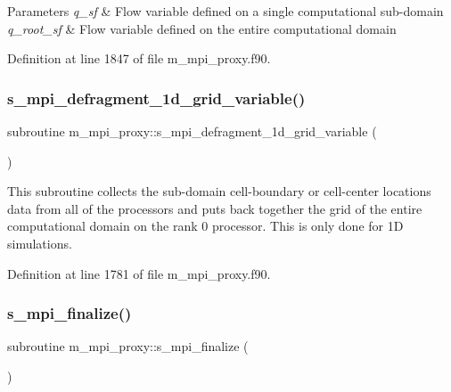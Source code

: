 \begin{DoxyParams}{Parameters}
{\em q\+\_\+sf} & Flow variable defined on a single computational sub-\/domain \\
\hline
{\em q\+\_\+root\+\_\+sf} & Flow variable defined on the entire computational domain \\
\hline
\end{DoxyParams}


Definition at line 1847 of file m\+\_\+mpi\+\_\+proxy.\+f90.

\mbox{\label{namespacem__mpi__proxy_ac15a15ba12e6110bb015af0ece5bba47}} 
\subsubsection{\texorpdfstring{s\+\_\+mpi\+\_\+defragment\+\_\+1d\+\_\+grid\+\_\+variable()}{s\_mpi\_defragment\_1d\_grid\_variable()}}
{\footnotesize\ttfamily subroutine m\+\_\+mpi\+\_\+proxy\+::s\+\_\+mpi\+\_\+defragment\+\_\+1d\+\_\+grid\+\_\+variable (\begin{DoxyParamCaption}{ }\end{DoxyParamCaption})}



This subroutine collects the sub-\/domain cell-\/boundary or cell-\/center locations data from all of the processors and puts back together the grid of the entire computational domain on the rank 0 processor. This is only done for 1D simulations. 



Definition at line 1781 of file m\+\_\+mpi\+\_\+proxy.\+f90.

\mbox{\label{namespacem__mpi__proxy_a43fbda10c02ec8bc1fc572c83090f2e5}} 
\subsubsection{\texorpdfstring{s\+\_\+mpi\+\_\+finalize()}{s\_mpi\_finalize()}}
{\footnotesize\ttfamily subroutine m\+\_\+mpi\+\_\+proxy\+::s\+\_\+mpi\+\_\+finalize (\begin{DoxyParamCaption}{ }\end{DoxyParamCaption})}



